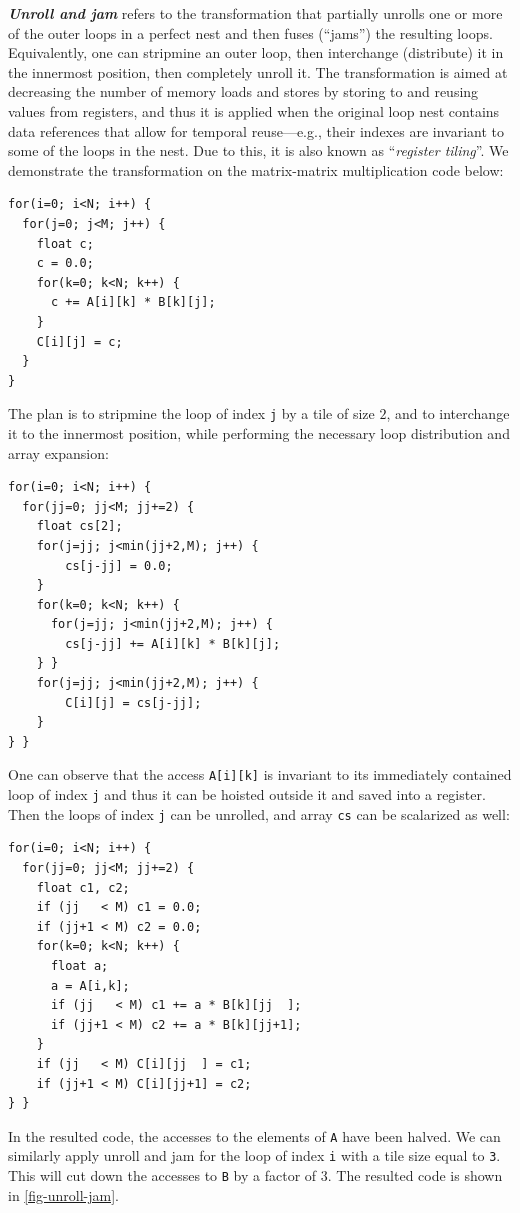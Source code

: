 \textbf{\em Unroll and jam} refers to the transformation that partially
unrolls one or more of the outer loops in a perfect nest and then
fuses (``jams'') the resulting loops. Equivalently, one can stripmine
an outer loop, then interchange (distribute) it in the innermost
position, then completely unroll it. The transformation is aimed at
decreasing the number of memory loads and stores by storing to and
reusing values from registers, and thus it is applied when the
original loop nest contains data references that allow for temporal
reuse---e.g., their indexes are invariant to some of the loops
in the nest.
Due to this, it is also known as ``{\em register tiling}''.
We demonstrate the transformation on the matrix-matrix
multiplication code below:
\begin{lstlisting}[mathescape=true]
for(i=0; i<N; i++) {
  for(j=0; j<M; j++) {
    float c;
    c = 0.0;
    for(k=0; k<N; k++) {
      c += A[i][k] * B[k][j];
    }
    C[i][j] = c;
  }
}
\end{lstlisting}

The plan is to stripmine the loop of index \texttt{j} by a tile of
size $2$, and to interchange it to the innermost position, while
performing the necessary loop distribution and array expansion:
\begin{lstlisting}[mathescape=true]
for(i=0; i<N; i++) {
  for(jj=0; jj<M; jj+=2) {
    float cs[2];
    for(j=jj; j<min(jj+2,M); j++) {
        cs[j-jj] = 0.0;
    }
    for(k=0; k<N; k++) {
      for(j=jj; j<min(jj+2,M); j++) {
        cs[j-jj] += A[i][k] * B[k][j];
    } }
    for(j=jj; j<min(jj+2,M); j++) {
        C[i][j] = cs[j-jj];
    }
} }
\end{lstlisting}
One can observe that the access \texttt{A[i][k]} is invariant to its
immediately contained loop of index \texttt{j} and thus it can be hoisted
outside it and saved into a register. Then the loops of index \texttt{j}
can be unrolled, and array \texttt{cs} can be scalarized as well:
\begin{lstlisting}[mathescape=true]
for(i=0; i<N; i++) {
  for(jj=0; jj<M; jj+=2) {
    float c1, c2;
    if (jj   < M) c1 = 0.0;
    if (jj+1 < M) c2 = 0.0;
    for(k=0; k<N; k++) {
      float a;
      a = A[i,k];
      if (jj   < M) c1 += a * B[k][jj  ];
      if (jj+1 < M) c2 += a * B[k][jj+1];
    }
    if (jj   < M) C[i][jj  ] = c1;
    if (jj+1 < M) C[i][jj+1] = c2;
} }
\end{lstlisting}
In the resulted code, the accesses to the elements of \texttt{A} have
been halved.   We can similarly apply unroll and jam for the loop
of index \texttt{i} with a tile size equal to \texttt{3}. This will cut down
the accesses to \texttt{B} by a factor of $3$. The resulted code
is shown in \cref{fig-unroll-jam}.

